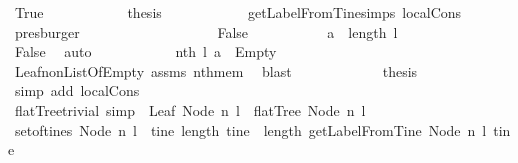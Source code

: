 \begin{isabellebody}
\ True\isanewline
\ \ \ \ \ \ \ \ \isamarkupfalse%
\ \isamarkupfalse%
\ {\isacharquery}thesis\isanewline
\ \ \ \ \ \ \ \ \ \ \isamarkupfalse%
\ getLabelFromTine{\isachardot}simps{\isacharparenleft}{}{\isacharparenright}\ local{\isachardot}Cons\ \isamarkupfalse%
\ presburger\ \isanewline
\ \ \ \ \ \ \isamarkupfalse%
\ \isanewline
\ \ \ \ \ \ \ \ \isamarkupfalse%
\ False\ \isanewline
\ \ \ \ \ \ \ \ \isamarkupfalse%
\ {\isachardoublequoteopen}a\ {\isacharless}\ length\ l{\isachardoublequoteclose}\isanewline
\ \ \ \ \ \ \ \ \ \ \isamarkupfalse%
\ False\ \isamarkupfalse%
\ auto\isanewline
\ \ \ \ \ \ \ \ \isamarkupfalse%
\ \isamarkupfalse%
\ {\isachardoublequoteopen}nth\ l\ a\ {\isacharequal}\ Empty{\isachardoublequoteclose}\isanewline
\ \ \ \ \ \ \ \ \ \ \isamarkupfalse%
\ Leaf{\isacharunderscore}non{\isacharunderscore}ListOfEmpty\ assms\ nth{\isacharunderscore}mem\ \isamarkupfalse%
\ blast\ \isanewline
\ \ \ \ \ \ \ \ \isamarkupfalse%
\ \isamarkupfalse%
\ {\isacharquery}thesis\isanewline
\ \ \ \ \ \ \ \ \ \ \isamarkupfalse%
\ {\isacharparenleft}simp\ add{\isacharcolon}\ local{\isachardot}Cons{\isacharparenright}\ \ \ \ \ \ \ \ \ \isanewline
\ \ \ \ \ \ \isamarkupfalse%
\isanewline
\ \ \isamarkupfalse%
%
\endisatagproof
{\isafoldproof}%
%
\isadelimproof
\isanewline
%
\endisadelimproof
\ \isanewline
{}\isamarkupfalse%
\ flatTree{\isacharunderscore}trivial\ {\isacharbrackleft}simp{\isacharbrackright}{\isacharcolon}\ \ {\isachardoublequoteopen}Leaf\ {\isacharparenleft}Node\ n\ l{\isacharparenright}{\isachardoublequoteclose}\ \ {\isachardoublequoteopen}flatTree\ {\isacharparenleft}Node\ n\ l{\isacharparenright}{\isachardoublequoteclose}\isanewline
%
\isadelimproof
%
\endisadelimproof
%
\isatagproof
{}\isamarkupfalse%
\ {\isacharminus}\isanewline
\ \ \isamarkupfalse%
\ {\isachardoublequoteopen}set{\isacharunderscore}of{\isacharunderscore}tines\ {\isacharparenleft}Node\ n\ l{\isacharparenright}\ {\isacharequal}\ {\isacharbraceleft}tine{\isachardot}\ length\ tine\ {\isacharequal}\ length\ {\isacharparenleft}getLabelFromTine\ {\isacharparenleft}Node\ n\ l{\isacharparenright}\ tine{\isacharparenright}{\isacharbraceright}{\isachardoublequoteclose}\isanewline
\ \ \ \ \isamarkupfalse%

\end{isabellebody}
